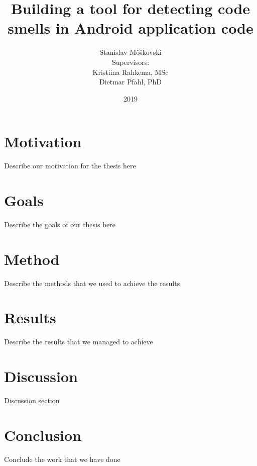 \documentclass{beamer}
\title{Building a tool for detecting code smells in Android application code}
\author[Stanislav Mõškovski]{Stanislav Mõškovski\\ {\vspace{8mm}\small Supervisors: \\ Kristiina Rahkema, MSc \\Dietmar Pfahl, PhD}}
\institute{University of Tartu}
\date{2019}
\begin{document}
    \frame{\titlepage}

    \section{Motivation}\label{sec:motivation}
    \begin{frame}{\secname}
        Describe our motivation for the thesis here
    \end{frame}

    \section{Goals}\label{sec:goals}
    \begin{frame}{\secname}
        Describe the goals of our thesis here
    \end{frame}

    \section{Method}\label{sec:method}
    \begin{frame}{\secname}
        Describe the methods that we used to achieve the results
    \end{frame}

    \section{Results}\label{sec:results}
    \begin{frame}{\secname}
        Describe the results that we managed to achieve
    \end{frame}

    \section{Discussion}\label{sec:discussion}
    \begin{frame}{\secname}
        Discussion section
    \end{frame}

    \section{Conclusion}\label{sec:conclusion}
    \begin{frame}{\secname}
        Conclude the work that we have done
    \end{frame}
\end{document}
